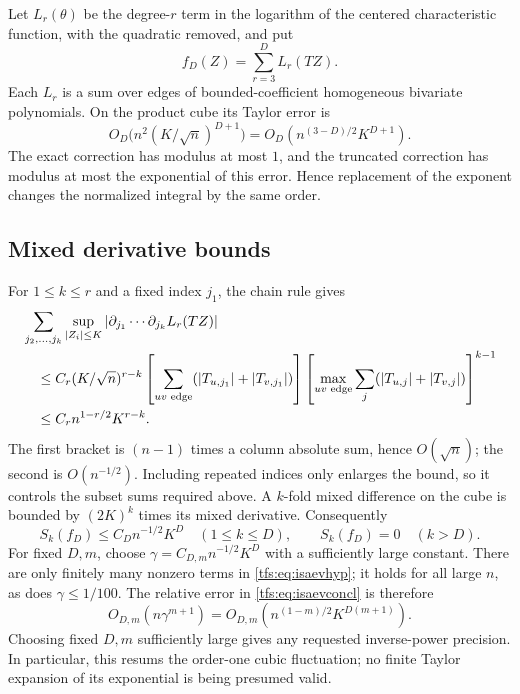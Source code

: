 \documentclass[11pt,a4paper]{article}
\numberwithin{equation}{section}
\theoremstyle{remark}
\newcommand{\1}{\mathbf 1}
\begin{document}
Let $L_r(\theta)$ be the degree-$r$ term in the logarithm of the centered
characteristic function, with the quadratic removed, and put
\[
f_D(Z)=\sum_{r=3}^D L_r(TZ).
\]
Each $L_r$ is a sum over edges of bounded-coefficient homogeneous
bivariate polynomials. On the product cube its Taylor error is
\begin{equation}\label{tfs:eq:taylorerror}
O_D\bigl(n^2(K/\sqrt n)^{D+1}\bigr)
                 =O_D(n^{(3-D)/2}K^{D+1}).
\end{equation}
The exact correction has modulus at most $1$, and the truncated correction
has modulus at most the exponential of this error. Hence replacement of
the exponent changes the normalized integral by the same order.

\subsection{Mixed derivative bounds}
For $1\leq k\leq r$ and a fixed index $j_1$, the chain rule gives
\begin{align}\label{tfs:eq:derivative}
&\sum_{j_2,\ldots,j_k}\sup_{|Z_i|\leq K}
 |\partial_{j_1}\cdots\partial_{j_k}L_r(TZ)|\notag\\
&\quad\leq C_r(K/\sqrt n)^{r-k}
 \left[\sum_{uv\text{ edge}}(|T_{u,j_1}|+|T_{v,j_1}|)\right]
 \left[\max_{uv\text{ edge}}\sum_j(|T_{u,j}|+|T_{v,j}|)\right]^{k-1}
 \notag\\
&\quad\leq C_r n^{1-r/2}K^{r-k}.
\end{align}
The first bracket is $(n-1)$ times a column absolute sum, hence
$O(\sqrt n)$; the second is $O(n^{-1/2})$. Including repeated indices
only enlarges the bound, so it controls the subset sums required above.
A $k$-fold mixed difference on the cube is bounded by $(2K)^k$ times its
mixed derivative. Consequently
\begin{equation}\label{tfs:eq:Sk}
S_k(f_D)\leq C_D n^{-1/2}K^D\quad(1\leq k\leq D),\qquad
S_k(f_D)=0\quad(k>D).
\end{equation}
For fixed $D,m$, choose
$\gamma=C_{D,m}n^{-1/2}K^D$ with a sufficiently large constant. There
are only finitely many nonzero terms in \eqref{tfs:eq:isaevhyp}; it holds for
all large $n$, as does $\gamma\leq1/100$. The relative error in
\eqref{tfs:eq:isaevconcl} is therefore
\begin{equation}\label{tfs:eq:cumulanttail}
O_{D,m}(n\gamma^{m+1})=
                O_{D,m}(n^{(1-m)/2}K^{D(m+1)}).
\end{equation}
Choosing fixed $D,m$ sufficiently large gives any requested inverse-power
precision. In particular, this resums the order-one cubic fluctuation;
no finite Taylor expansion of its exponential is being presumed valid.
\end{document}
